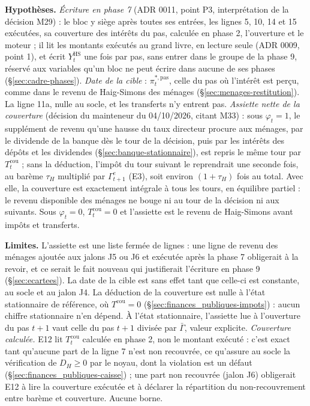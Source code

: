 \documentclass[11pt,a4paper]{article}
\newcommand{\hyp}{\par\noindent\textbf{Hypothèses.} }
\newcommand{\limites}{\par\noindent\textbf{Limites.} }
\begin{document}
\begin{proposee}
\hyp \emph{Écriture en phase 7} (ADR 0011, point P3, interprétation de la décision M29) : le bloc y siège après toutes ses entrées, les lignes 5, 10, 14 et 15 exécutées, sa couverture des intérêts du pas, calculée en phase 2, l'ouverture et le moteur ; il lit les montants exécutés au grand livre, en lecture seule (ADR 0009, point 1), et écrit $Y^{\mathrm{HS}}_t$ une fois par pas, sans entrer dans le groupe de la phase 9, réservé aux variables qu'un bloc ne peut écrire dans aucune de ses phases (\S\ref{sec:cadre-phases}). \emph{Date de la cible} : $\pi^{\ast,\mathrm{pas}}_t$, celle du pas où l'intérêt est perçu, comme dans le revenu de Haig-Simons des ménages (\S\ref{sec:menages-restitution}). La ligne 11a, nulle au socle, et les transferts n'y entrent pas. \emph{Assiette nette de la couverture} (décision du mainteneur du 04/10/2026, citant M33) : sous $\varphi_t = 1$, le supplément de revenu qu'une hausse du taux directeur procure aux ménages, par le dividende de la banque dès le tour de la décision, puis par les intérêts des dépôts et les dividendes (\S\ref{sec:banque-stationnaire}), est repris le même tour par $T^{\mathrm{cou}}_t$ ; sans la déduction, l'impôt du tour suivant le reprendrait une seconde fois, au barème $\tau_H$ multiplié par $\Gamma^e_{t+1}$ (E3), soit environ $(1 + \tau_H)$ fois au total. Avec elle, la couverture est exactement intégrale à tous les tours, en équilibre partiel : le revenu disponible des ménages ne bouge ni au tour de la décision ni aux suivants. Sous $\varphi_t = 0$, $T^{\mathrm{cou}}_t = 0$ et l'assiette est le revenu de Haig-Simons avant impôts et transferts.
\limites L'assiette est une liste fermée de lignes : une ligne de revenu des ménages ajoutée aux jalons J5 ou J6 et exécutée après la phase 7 obligerait à la revoir, et ce serait le fait nouveau qui justifierait l'écriture en phase 9 (\S\ref{sec:ecartees}). La date de la cible est sans effet tant que celle-ci est constante, au socle et au jalon J4. La déduction de la couverture est nulle à l'état stationnaire de référence, où $T^{\mathrm{cou}} = 0$ (\S\ref{sec:finances_publiques-impots}) : aucun chiffre stationnaire n'en dépend. À l'état stationnaire, l'assiette lue à l'ouverture du pas $t + 1$ vaut celle du pas $t + 1$ divisée par $\bar\Gamma$, valeur explicite. \emph{Couverture calculée.} E12 lit $T^{\mathrm{cou}}_t$ calculée en phase 2, non le montant exécuté : c'est exact tant qu'aucune part de la ligne 7 n'est non recouvrée, ce qu'assure au socle la vérification de $D_H \ge 0$ par le noyau, dont la violation est un défaut (\S\ref{sec:finances_publiques-caisse}) ; une part non recouvrée (jalon J6) obligerait E12 à lire la couverture exécutée et à déclarer la répartition du non-recouvrement entre barème et couverture. Aucune borne.


\end{proposee}
\end{document}
